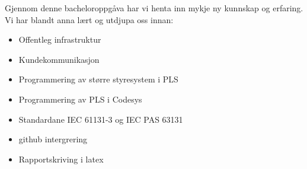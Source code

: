 Gjennom denne bacheloroppgåva har vi henta inn mykje ny kunnskap og erfaring.
Vi har blandt anna lært og utdjupa oss innan:

\begin{itemize}
    \item Offentleg infrastruktur
    \item Kundekommunikasjon
    \item Programmering av større styresystem i \gls{PLS}
    \item Programmering av \gls{PLS} i \gls{Codesys}
    \item Standardane \gls{IEC} 61131-3 og \gls{IEC} \gls{PAS} 63131
    \item \Gls{github} intergrering
    \item Rapportskriving i \gls{latex}
\end{itemize}






